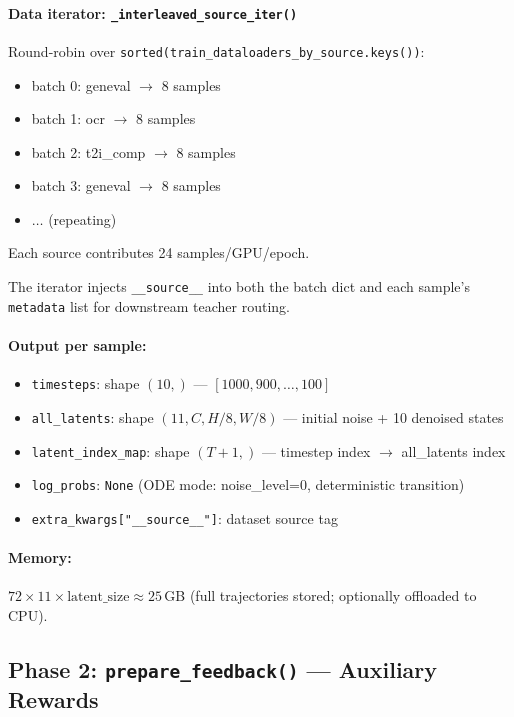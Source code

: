 \documentclass[11pt]{article}
\begin{document}
\paragraph{Data iterator: \texttt{\_interleaved\_source\_iter()}}

Round-robin over \texttt{sorted(train\_dataloaders\_by\_source.keys())}:
\begin{itemize}[nosep]
    \item batch 0: geneval $\rightarrow$ 8 samples
    \item batch 1: ocr $\rightarrow$ 8 samples
    \item batch 2: t2i\_comp $\rightarrow$ 8 samples
    \item batch 3: geneval $\rightarrow$ 8 samples
    \item $\ldots$ (repeating)
\end{itemize}
Each source contributes 24 samples/GPU/epoch.

The iterator injects \texttt{\_\_source\_\_} into both the batch dict and each sample's \texttt{metadata} list for downstream teacher routing.

\paragraph{Output per sample:}
\begin{itemize}[nosep]
    \item \texttt{timesteps}: shape $(10,)$ --- $[1000, 900, \ldots, 100]$
    \item \texttt{all\_latents}: shape $(11, C, H/8, W/8)$ --- initial noise + 10 denoised states
    \item \texttt{latent\_index\_map}: shape $(T\!+\!1,)$ --- timestep index $\to$ all\_latents index
    \item \texttt{log\_probs}: \texttt{None} (ODE mode: noise\_level=0, deterministic transition)
    \item \texttt{extra\_kwargs["\_\_source\_\_"]}: dataset source tag
\end{itemize}

\paragraph{Memory:} $72 \times 11 \times \text{latent\_size} \approx 25$\,GB (full trajectories stored; optionally offloaded to CPU).

\subsection{Phase 2: \texttt{prepare\_feedback()} --- Auxiliary Rewards}
\end{document}
